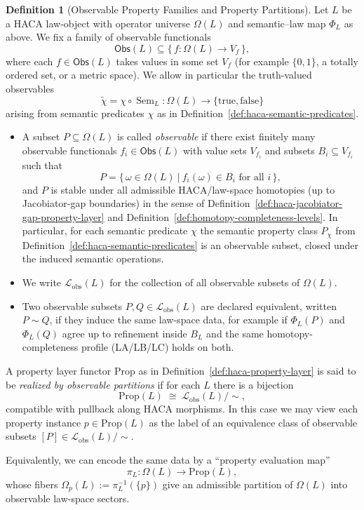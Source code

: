 \documentclass[11pt]{book}
\theoremstyle{plain}
\theoremstyle{definition}
\newtheorem{definition}[theorem]{Definition}
\theoremstyle{remark}
\begin{document}
\begin{definition}[Observable Property Families and Property Partitions]
\label{def:haca-observable-properties}
Let $L$ be a HACA law-object with operator universe $\Omega(L)$ and
semantic--law map $\Phi_L$ as above. We fix a family of observable
functionals
\[
  \mathsf{Obs}(L)\subseteq \bigl\{\, f:\Omega(L)\to V_f \,\bigr\},
\]
where each $f\in\mathsf{Obs}(L)$ takes values in some set $V_f$ (for
example $\{0,1\}$, a totally ordered set, or a metric space). We allow in
particular the truth-valued observables
\[
  \tilde{\chi}
  =
  \chi\circ\operatorname{Sem}_L :
  \Omega(L)\to\{\mathrm{true},\mathrm{false}\}
\]
arising from semantic predicates $\chi$ as in
Definition~\ref{def:haca-semantic-predicates}.

\begin{itemize}
  \item A subset $P\subseteq \Omega(L)$ is called \emph{observable} if
        there exist finitely many observable functionals
        $f_i\in\mathsf{Obs}(L)$ with value sets $V_{f_i}$ and subsets
        $B_i\subseteq V_{f_i}$ such that
        \[
          P
          =
          \bigl\{\, \omega\in\Omega(L)\ \big|\ f_i(\omega)\in B_i
          \text{ for all }i \,\bigr\},
        \]
        and $P$ is stable under all admissible HACA/law-space homotopies
        (up to Jacobiator-gap boundaries) in the sense of
        Definition~\ref{def:haca-jacobiator-gap-property-layer} and
        Definition~\ref{def:homotopy-completeness-levels}.
        In particular, for each semantic predicate $\chi$ the semantic
        property class $P_\chi$ from
        Definition~\ref{def:haca-semantic-predicates} is an observable
        subset, closed under the induced semantic operations.
  \item We write $\mathcal{L}_{\mathrm{obs}}(L)$ for the collection of all
        observable subsets of $\Omega(L)$.
  \item Two observable subsets $P,Q\in\mathcal{L}_{\mathrm{obs}}(L)$ are
        declared equivalent, written $P\sim Q$, if they induce the same
        law-space data, for example if $\Phi_L(P)$ and $\Phi_L(Q)$ agree
        up to refinement inside $B_L$ and the same homotopy-completeness
        profile (LA/LB/LC) holds on both.
\end{itemize}
A property layer functor $\mathrm{Prop}$ as in
Definition~\ref{def:haca-property-layer} is said to be \emph{realized by
observable partitions} if for each $L$ there is a bijection
\[
  \mathrm{Prop}(L)
  \;\cong\;
  \mathcal{L}_{\mathrm{obs}}(L) / \sim,
\]
compatible with pullback along HACA morphisms. In this case we may view
each property instance $p\in\mathrm{Prop}(L)$ as the label of an
equivalence class of observable subsets
$[P]\in\mathcal{L}_{\mathrm{obs}}(L)/\sim$.

Equivalently, we can encode the same data by a ``property evaluation
map''
\[
  \pi_L : \Omega(L) \longrightarrow \mathrm{Prop}(L),
\]
whose fibers $\Omega_p(L):=\pi_L^{-1}(\{p\})$ give an admissible
partition of $\Omega(L)$ into observable law-space sectors.



\end{definition}
\end{document}
